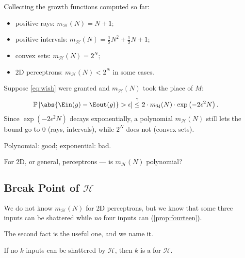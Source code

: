 Collecting the growth functions computed so far:

\begin{itemize}
    \item positive rays: \(m_{\mathcal{H}}(N) = N + 1\);
    \item positive intervals: \(m_{\mathcal{H}}(N) = \tfrac{1}{2} N^2 +
        \tfrac{1}{2} N + 1\);
    \item convex sets: \(m_{\mathcal{H}}(N) = 2^N\);
    \item 2D perceptrons: \(m_{\mathcal{H}}(N) < 2^N\) in some cases.
\end{itemize}

Suppose \autoref{eq:wish} were granted and \(m_{\mathcal{H}}(N)\) took the
place of \(M\):
\[
    \mathbb{P}\left[ \abs{\Ein(g) - \Eout(g)} > \epsilon \right]
    \overset{?}{\le} 2 \cdot m_{\mathcal{H}}(N) \cdot
    \exp \left( -2 \epsilon^2 N \right) .
\]
Since \(\exp(-2\epsilon^2 N)\) decays exponentially, a polynomial
\(m_{\mathcal{H}}(N)\) still lets the bound go to \(0\) (rays, intervals), while
\(2^N\) does not (convex sets).

\begin{moral}
    Polynomial: good; exponential: bad.
\end{moral}

\begin{question}\label{q:perceptron-poly}
    For 2D, or general, perceptrons --- is \(m_{\mathcal{H}}(N)\) polynomial?
\end{question}

\subsection{Break Point of \texorpdfstring{\(\mathcal{H}\)}{H}}

We do not know \(m_{\mathcal{H}}(N)\) for 2D perceptrons, but we know that
some three inputs can be shattered while \emph{no} four inputs can
(\autoref{prop:fourteen}).

\begin{center}
\end{center}

The second fact is the useful one, and we name it.

\begin{definition}\label{def:break}
    If no \(k\) inputs can be shattered by \(\mathcal{H}\), then \(k\) is a
     for \(\mathcal{H}\).
\end{definition}

